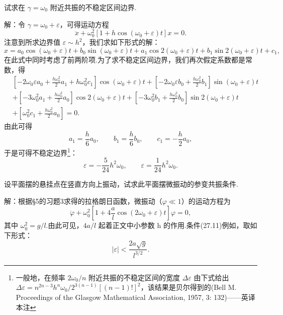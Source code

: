 \begin{xiti}
\quad 试求在 $\gamma=\omega_0$ 附近共振的不稳定区间边界.

解：令 $\gamma=\omega_0+\varepsilon$，可得运动方程
\begin{equation*}
  \ddot{x}+\omega_0^2\left[1+h\cos\left(\omega_0+\varepsilon\right)t\right]x=0.
\end{equation*}
注意到所求边界值 $\varepsilon\sim h^2$，我们求如下形式的解：
\begin{equation*}
  x=a_0\cos\left(\omega_0+\varepsilon\right)t+b_0\sin\left(\omega_0+\varepsilon\right)t
  +a_1\cos 2\left(\omega_0+\varepsilon\right)t
  +b_1\sin 2\left(\omega_0+\varepsilon\right)t+c_1,
\end{equation*}
在此式中同时考虑了前两阶项.为了求不稳定区间边界，我们再次假定系数都是常数，得
\begin{equation*}
\begin{aligned}
  &\left[-2\omega_0\varepsilon a_0+\frac{h\omega_0^2}{2}a_1+h\omega_0^2c_1\right]
  \cos\left(\omega_0+\varepsilon\right)t
  +\left[-2\omega_0\varepsilon b_0+\frac{h\omega_0^2}{2}b_1\right]
  \sin\left(\omega_0+\varepsilon\right)t\\
  &+\left[-3\omega_0^2a_1+\frac{h\omega_0^2}{2}a_0\right]
  \cos 2\left(\omega_0+\varepsilon\right)t
  +\left[-3\omega_0^2b_1+\frac{h\omega_0^2}{2}b_0\right]
  \sin 2\left(\omega_0+\varepsilon\right)t\\
  &+\left[\omega_0^2c_1+\frac{h\omega_0^2}{2}a_0\right]=0.
\end{aligned}
\end{equation*}
由此可得
\begin{equation*}
  a_1=\frac{h}{6}a_0,\qquad
  b_1=\frac{h}{6}b_0,\qquad
  c_1=-\frac{h}{2}a_0,
\end{equation*}
于是可得不稳定边界\footnote{一般地，在频率 $2\omega_0/n$ 附近共振的不稳定区间的宽度 $\Delta\varepsilon$ 由下式给出 $\Delta\varepsilon=n^{2n-3}h^n\omega_0/2^{3(n-1)}[(n-1)!]^2$，该结果是贝尔得到的(Bell M. Proceedings of the Glasgow Mathematical Association, 1957, 3: 132)——英译本注}：
\begin{equation*}
  \varepsilon=-\frac{5}{24}h^2\omega_0,\qquad
  \varepsilon=\frac{1}{24}h^2\omega_0.
\end{equation*}

\quad 设平面摆的悬挂点在竖直方向上振动，试求此平面摆微振动的参变共振条件.

解：根据§5的习题3求得的拉格朗日函数，微振动（$\varphi\ll1$）的运动方程为
\begin{equation*}
  \ddot{\varphi}+\omega_0^2\left[1+4\frac{a}{l}\cos\left(2\omega_0+\varepsilon\right)t\right]\varphi=0,
\end{equation*}
其中 $\omega_0^2=g/l$.由此可见，$4a/l$ 起着正文中小参数 h 的作用.条件(27.11)例如，取如下形式：
\begin{equation*}
  |\varepsilon|<\frac{2a\sqrt{g}}{l^{3/2}}.
\end{equation*}

\end{xiti}

